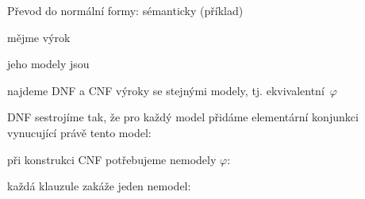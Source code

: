 \documentclass{beamer}
\begin{document}
\begin{frame}{Převod do normální formy: sémanticky (příklad)}

    mějme výrok 

    jeho modely jsou 

    najdeme DNF a CNF výroky se stejnými modely, tj. ekvivalentní~$\varphi$

    DNF sestrojíme tak, že pro každý model přidáme elementární konjunkci vynucující právě tento model:    

    při konstrukci CNF potřebujeme \alert{nemodely} $\varphi$: 

    každá klauzule zakáže jeden nemodel: 

\end{frame}
\end{document}
